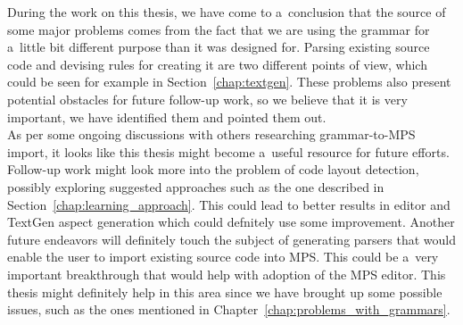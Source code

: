 During the work on this thesis, we have come to a~conclusion that the source of some major problems comes from the fact that we are using the grammar for a~little bit different purpose than it was designed for.
Parsing existing source code and devising rules for creating it are two different points of view, which could be seen for example in Section~\ref{chap:textgen}.
These problems also present potential obstacles for future follow-up work, so we believe that it is very important, we have identified them and pointed them out.
\\

As per some ongoing discussions with others researching grammar-to-MPS import, it looks like this thesis might become a~useful resource for future efforts.
Follow-up work might look more into the problem of code layout detection, possibly exploring suggested approaches such as the one described in Section~\ref{chap:learning_approach}.
This could lead to better results in editor and TextGen aspect generation which could defnitely use some improvement.
Another future endeavors will definitely touch the subject of generating parsers that would enable the user to import existing source code into MPS.
This could be a~very important breakthrough that would help with adoption of the MPS editor.
This thesis might definitely help in this area since we have brought up some possible issues, such as the ones mentioned in Chapter~\ref{chap:problems_with_grammars}.
